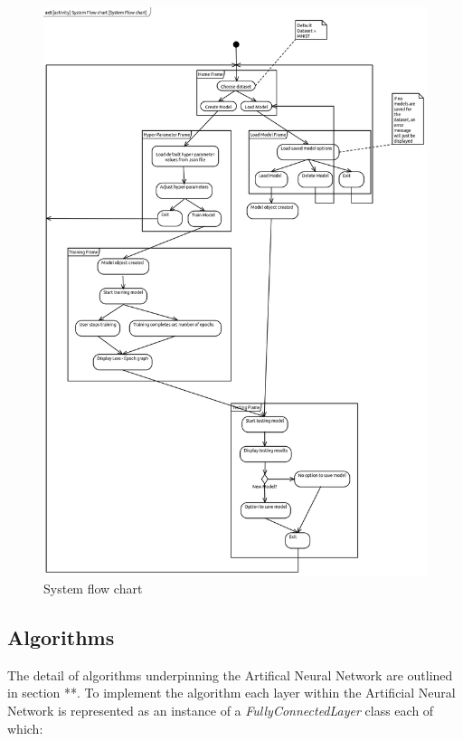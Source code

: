 \documentclass[./project-report/src/latex/project-report.tex]{subfiles}
\begin{document}
\begin{figure}[h!]
\centering
\includegraphics[width=1\textwidth]{./project-report/src/images/system-flow-chart.png}
\caption{System flow chart}
\label{fig:system-flow-chart}
\end{figure}

\subsection{Algorithms}

The detail of algorithms underpinning the Artifical Neural Network are outlined in section **. To implement the algorithm each layer within the Artificial Neural Network is 
represented as an instance of a \textit{FullyConnectedLayer} class each of which:
\end{document}
